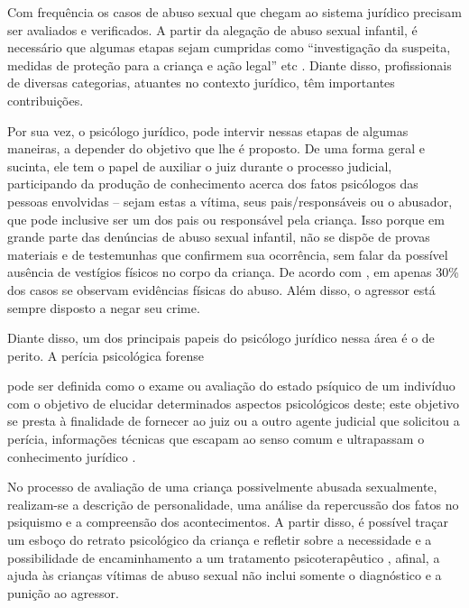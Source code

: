 Com frequência os casos de abuso sexual que chegam ao sistema jurídico precisam ser avaliados e verificados. A partir da alegação de abuso sexual infantil, é necessário que algumas etapas sejam cumpridas como ``investigação da suspeita, medidas de proteção para a criança e ação legal'' etc . Diante disso, profissionais de diversas categorias, atuantes no contexto jurídico, têm importantes contribuições. 

Por sua vez, o psicólogo jurídico, pode intervir nessas etapas de algumas maneiras, a depender do objetivo que lhe é proposto. De uma forma geral e sucinta, ele tem o papel de auxiliar o juiz durante o processo judicial, participando da produção de conhecimento acerca dos fatos psicólogos das pessoas envolvidas -- sejam estas a vítima, seus pais/responsáveis ou o abusador, que pode inclusive ser um dos pais ou responsável pela criança. Isso porque em grande parte das denúncias de abuso sexual infantil, não se dispõe de provas materiais e de testemunhas que confirmem  sua ocorrência, sem falar da possível ausência de vestígios físicos no corpo da criança. De acordo com , em apenas 30\% dos casos se observam evidências físicas do abuso. Além disso, o agressor está sempre disposto a negar seu crime. 

Diante disso, um dos principais papeis do psicólogo jurídico nessa área é o de perito. A perícia psicológica forense

\begin{citacao}
	pode ser definida como o exame ou avaliação do estado psíquico de um indivíduo com o objetivo de elucidar determinados aspectos psicológicos deste; este objetivo se presta à finalidade de fornecer ao juiz ou a outro agente judicial que solicitou a perícia, informações técnicas que escapam ao senso comum e ultrapassam o conhecimento jurídico \cite[p. 36]{JUNG2006}.
\end{citacao}

No processo de avaliação de uma criança possivelmente abusada sexualmente, realizam-se a descrição de personalidade, uma análise da repercussão dos fatos no psiquismo e a compreensão dos acontecimentos. A partir disso, é possível traçar um esboço do retrato psicológico da criança e refletir sobre a necessidade e a possibilidade de encaminhamento a um tratamento psicoterapêutico , afinal, a ajuda às crianças vítimas de abuso sexual não inclui somente o diagnóstico e a punição ao agressor. 

